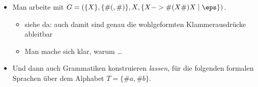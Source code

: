 \begin{tutorium}
\begin{itemize}
\begin{itemize}
      \begin{itemize}
      \item erste einfache wie $X => \#(X\#) => \#(\#(X\#)\#) =>
        \#(\#(\#(X\#)\#)\#) => \#(\#(\#(\#(X\#)\#)\#)\#) =>
        \#(\#(\#(\#(\#)\#)\#)\#) $ oder
      \item $X => XX => XXX => XXXX => XXXXX$ und dann irgendwie weiter
      \end{itemize}
    \item Welche Wörter $w$ sind ableitbar?
      \begin{itemize}
      \item anschaulich: ableitbar sind genau die "`\emph{wohlgeformten
          Klammerausdrücke}"'
      \item jedenfalls gleich viele \#( und \#): $N_{\#(}(w) = N_{\#)}(w)$
      \item Das ist aber nur notwendig aber nicht hinreichend für
        Ableitbarkeit, denn \#{)(} ist \zB nicht ableitbar.
      \item Man diskutiere die Adjektive "`\emph{notwendig}"' und
        "`\emph{hinreichend}"'.
      \item zusätzliche Eigenschaften? erst mal raten/ nachdenken/
        rumprobieren lassen
      \item aha: für jedes Präfix (es heißt \emph{das} Präfix) $v$ eines
        $w\in L(G)$
        gilt: $N_{\#(}(v) \geq N_{\#)}(v)$\\
        Das kann man sich gerade noch klar machen; aber der Beweis, dass
        man damit eine notwendige und hinreichende Bedingung für
        Ableitbarkeit hat, also eine Charakterisierung der
        Klammerausdrücke, ist wohl zu schwierig; ich sehe jedenfalls auf
        Anhieb keine vernünftige Erklärung.
      \end{itemize}
    \end{itemize}
  \item Man arbeite mit $G=(\{X\}, \{ \#(, \#)\}, X, \{X -> \#(X\#)X \;|\;  \eps\})$.
    \begin{itemize}
    \item siehe da: auch damit sind genau die wohlgeformten Klammerausdrücke ableitbar
    \item Man mache sich klar, warum \dots
    \end{itemize}
  \item Und dann auch Grammatiken konstruieren \emph{lassen}, \zB für
    die folgenden formalen Sprachen über dem Alphabet $T=\{\#a,\#b\}$.
    \begin{itemize}

\end{itemize}
\end{itemize}
\end{tutorium}

